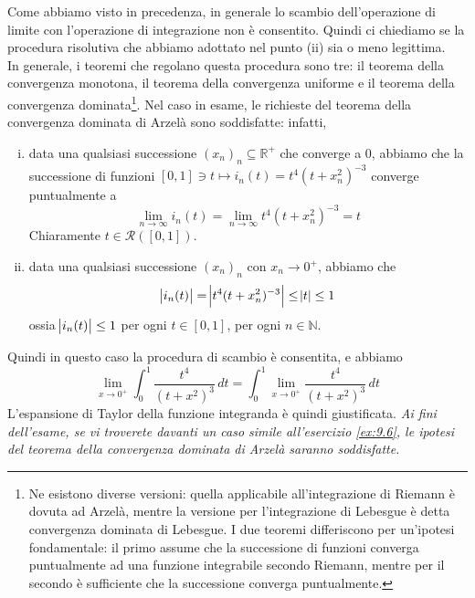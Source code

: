 \begin{remark}
    Come abbiamo visto in precedenza, in generale lo scambio dell'operazione di limite con l'operazione di integrazione non è consentito. Quindi ci chiediamo se la procedura risolutiva che abbiamo adottato nel punto (ii) sia o meno legittima.\\
    In generale, i teoremi che regolano questa procedura sono tre: il teorema della convergenza monotona, il teorema della convergenza uniforme e il teorema della convergenza dominata\footnote{Ne esistono diverse versioni: quella applicabile all'integrazione di Riemann è dovuta ad Arzelà, mentre la versione per l'integrazione di Lebesgue è detta convergenza dominata di Lebesgue. I due teoremi differiscono per un'ipotesi fondamentale: il primo assume che la successione di funzioni converga puntualmente ad una funzione integrabile secondo Riemann, mentre per il secondo è sufficiente che la successione converga puntualmente.}. Nel caso in esame, le richieste del teorema della convergenza dominata di Arzelà \cite{Arzelà_1885} sono soddisfatte: infatti,
    \begin{enumerate}[(i)]
        \item data una qualsiasi successione $(x_n)_n\subseteq \mathbb{R}^+$ che converge a $0$, abbiamo che la successione di funzioni $[0,1]\ni t \mapsto i_n(t) = t^4(t+x_n^2)^{-3}$ converge puntualmente a
        \[
        \lim_{n\to \infty} i_n(t) =  \lim_{n\to\infty} t^4(t+x_n^2)^{-3} = t
        \]
        Chiaramente $t\in\mathscr{R}([0,1])$. 
        \item data una qualsiasi successione $(x_n)_n$ con $x_n \to 0^+$, abbiamo che
        \[
        \abs{i_n(t)} = \abs{t^4(t+x_n^2)^{-3}} \le \abs{t} \le 1
        \]
        ossia $\abs{i_n(t)}\le 1$ per ogni $t\in[0,1]$, per ogni $n\in\mathbb{N}$.
    \end{enumerate}
         Quindi in questo caso la procedura di scambio è consentita, e abbiamo
        \[
        \lim_{x\to 0^+} \int_0^1 \frac{t^4}{(t+x^2)^3}\, dt = \int_0^1 \lim_{x\to 0^+} \frac{t^4}{(t+x^2)^3}\, dt
        \]
        L'espansione di Taylor della funzione integranda è quindi giustificata.
        \emph{Ai fini dell'esame, se vi troverete davanti un caso simile all'esercizio \ref{ex:9.6}, le ipotesi del teorema della convergenza dominata di Arzelà saranno soddisfatte.}\\
         
\end{remark}
\newpage